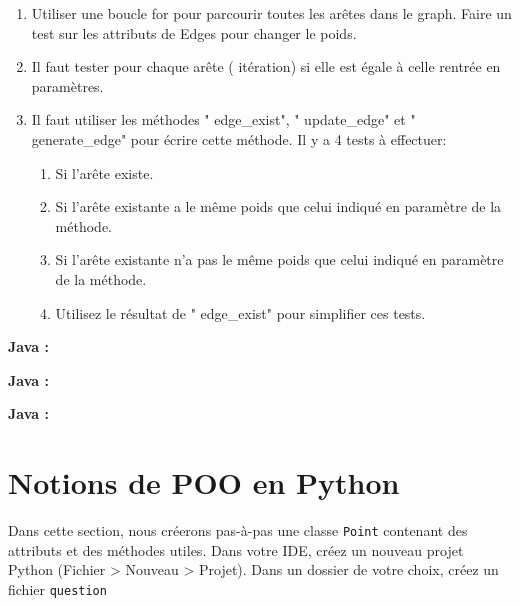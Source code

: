 \begin{Exercice}[20 minutes]
    \begin{conseil}
    \begin{enumerate}
    \item Utiliser une boucle for pour parcourir toutes les arêtes dans le graph. Faire un test sur les attributs de Edges pour changer le poids.
    \item Il faut tester pour chaque arête ( itération) si elle  est égale à celle rentrée en paramètres.
    \item Il faut utiliser les méthodes " edge\_exist", " update\_edge" et " generate\_edge" pour écrire cette méthode. Il y a 4 tests à effectuer: 
        \begin{enumerate}
        \item Si l'arête existe.
        \item Si l'arête existante a le même poids que celui indiqué en paramètre de la méthode.
        \item Si l'arête existante n'a pas le même poids que celui indiqué en paramètre de la méthode.
        \item Utilisez le résultat de " edge\_exist" pour simplifier ces tests.
        \end{enumerate}
    \end{enumerate}
    \end{conseil}
    \begin{solution}
    \textbf{Java :}
         
    \end{solution}
    \begin{solution}
    \textbf{Java :}
         
    \end{solution}
    \begin{solution}
    \textbf{Java :}
         
    \end{solution}

\end{Exercice}


\section{Notions de POO en Python}
Dans cette section, nous créerons pas-à-pas une classe \lstinline{Point} contenant des attributs et des méthodes utiles.
Dans votre IDE, créez un nouveau projet Python (Fichier > Nouveau > Projet). Dans un dossier de votre choix, créez un fichier \lstinline{question} %

